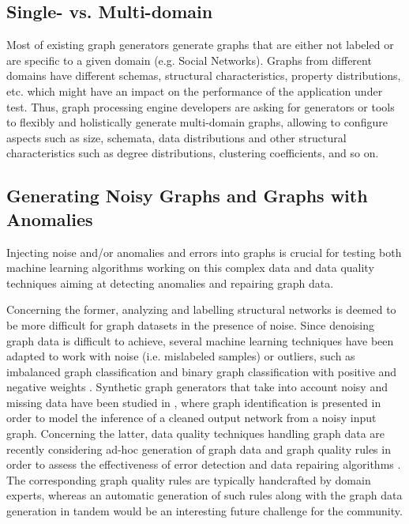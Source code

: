 \subsection{Single- vs. Multi-domain}

Most of existing graph generators generate graphs that are either not labeled or
are specific to a given domain (e.g.  Social Networks). Graphs from different
domains have different schemas, structural characteristics, property
distributions, etc. which might have an impact on the performance of the
application under test. Thus, graph processing engine developers are asking for
generators or tools to flexibly and holistically generate multi-domain graphs, allowing to configure aspects
such as size, schemata, data distributions and other structural
characteristics such as degree distributions, clustering coefficients, and
so on.

\subsection{Generating Noisy Graphs and Graphs with Anomalies}
Injecting noise and/or anomalies and errors into graphs is crucial for
testing both machine learning algorithms working on this complex data and
data quality techniques aiming at detecting anomalies and repairing graph
data.

Concerning the former, analyzing and labelling structural networks is
deemed to be more difficult for graph datasets in the presence of noise.
Since denoising graph data is difficult to achieve, several machine learning
techniques have been adapted to work with noise (i.e. mislabeled
samples) or outliers, such as
imbalanced graph classification \cite{PanZ13} and
binary graph classification with positive and negative weights \cite{CheungSML16}.
Synthetic graph generators that take into account noisy and missing data
have been studied in \cite{NamataG10}, where graph identification is presented in
order to  model the inference of a cleaned output network from a
noisy input graph.
Concerning the latter, data quality techniques handling graph data are recently considering ad-hoc
generation of graph data and graph quality rules in order to assess the
effectiveness of error detection and data repairing algorithms \cite{FanWX16a,AriouaB18}. The
corresponding graph quality rules are typically handcrafted by domain
experts, whereas an automatic generation of such rules along with the graph
data generation in tandem would be an interesting future challenge for the
community.

